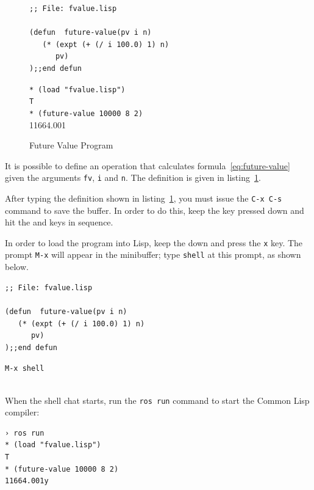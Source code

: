 \documentclass[a4paper,12pt]{book}
\newenvironment{fmpage}[1]
           {\begin{lrbox}{\fmbox}\begin{minipage}{#1}}
           {\end{minipage}\end{lrbox}\fbox{\usebox{\fmbox}}}
\begin{document}
\begin{figure}[!h]
\begin{fmpage}{0.8\textwidth}
\begin{verbatim}
;; File: fvalue.lisp

(defun  future-value(pv i n)
   (* (expt (+ (/ i 100.0) 1) n) 
      pv)
);;end defun
\end{verbatim}
\end{fmpage}

\begin{fmpage}{0.8\textwidth}
\verb|* (load "fvalue.lisp")|\\
\verb|T|\\
\verb|* (future-value 10000 8 2)|\\
11664.001
\end{fmpage}
\caption{Future Value Program}
\label{Texan:parking}
\end{figure}

It is possible to define an operation that
calculates formula~\ref{eq:future-value}
given the arguments \verb|fv|, \verb|i|
and \verb|n|. The definition is given
in listing~\ref{Texan:parking}.

After typing the definition shown in listing~\ref{Texan:parking},
you must issue the \verb|C-x C-s| command to save the buffer.
In order to do this, keep the  key pressed down and
hit the  and  keys in sequence.

In order to load the program into Lisp, keep the  down
and press the \verb|x| key. The prompt \verb|M-x| will appear
in the minibuffer; type \verb|shell| at this prompt, as shown below.\\

\begin{fmpage}{0.8\textwidth}
\begin{verbatim}
;; File: fvalue.lisp

(defun  future-value(pv i n)
   (* (expt (+ (/ i 100.0) 1) n) 
      pv)
);;end defun
\end{verbatim}
\end{fmpage}

\begin{fmpage}{0.8\textwidth}
\verb|M-x shell|\\
\end{fmpage}

\verb||\\
When the shell chat starts, run the \verb|ros run| command
to start the Common Lisp compiler:
\begin{verbatim}
› ros run
* (load "fvalue.lisp")
T
* (future-value 10000 8 2)
11664.001y
\end{verbatim}
\end{document}
